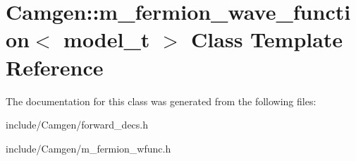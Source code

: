 \hypertarget{a00336}{}\section{Camgen\+:\+:m\+\_\+fermion\+\_\+wave\+\_\+function$<$ model\+\_\+t $>$ Class Template Reference}
\label{a00336}


The documentation for this class was generated from the following files\+:\begin{DoxyCompactItemize}
\item 
include/\+Camgen/forward\+\_\+decs.\+h\item 
include/\+Camgen/m\+\_\+fermion\+\_\+wfunc.\+h\end{DoxyCompactItemize}
